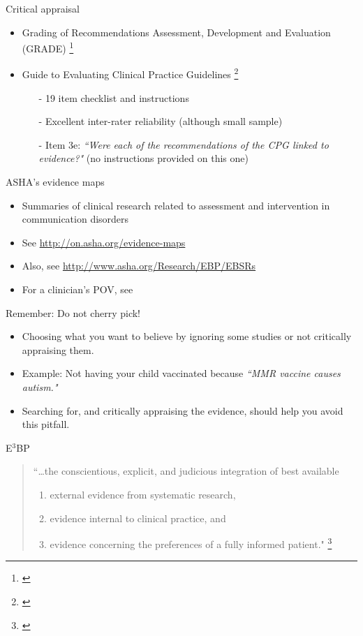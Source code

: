 \documentclass{beamer}
\begin{document}
% 
\begin{frame}{Critical appraisal}
	\begin{itemize}
	\item Grading of Recommendations Assessment, Development and Evaluation (GRADE) \footnote{\tiny{\citet[pp. 281ff]{Guyatt2008d}}}
	\item Guide to Evaluating Clinical Practice Guidelines \footnote{\tiny{\citet{Hargrove2008}}}
		\begin{itemize}
		\item[-] 19 item checklist and instructions
		\item[-] Excellent inter-rater reliability (although small sample)
		\item[-] Item 3e: \emph{``Were each of the recommendations of the CPG linked to evidence?"} (no instructions provided on this one)
		\end{itemize}
	\end{itemize}
\end{frame}

% 
\begin{frame}{ASHA's evidence maps}
	\begin{itemize}
	\item Summaries of clinical research related to assessment and intervention in communication disorders
	\item See \url{http://on.asha.org/evidence-maps}
	\item Also, see \url{http://www.asha.org/Research/EBP/EBSRs}
	\item For a clinician's POV, see \citet{VanDyke2018}
	\end{itemize}
\end{frame}

% 
\begin{frame}{Remember: \alert{Do not cherry pick!}}
	\begin{itemize}
	\item Choosing what you want to believe by ignoring some studies or not critically appraising them.
	\item Example: Not having your child vaccinated because \emph{``MMR vaccine causes autism."} 
	\item Searching for, and critically appraising the evidence, should help you avoid this pitfall. 
	\end{itemize}
\end{frame}

% 
\begin{frame}{E$^3$BP}
	\begin{quote}
	``\dots the conscientious, explicit, and judicious integration of  best available\\
		\begin{enumerate}
		\item external evidence from systematic research,
		\item evidence internal to clinical practice, and
		\item evidence concerning the preferences of a fully informed patient." \footnote{\tiny{\citet[p. 2]{Dollaghan2007a}}}
		\end{enumerate}
	\end{quote}
\end{frame}
\end{document}
